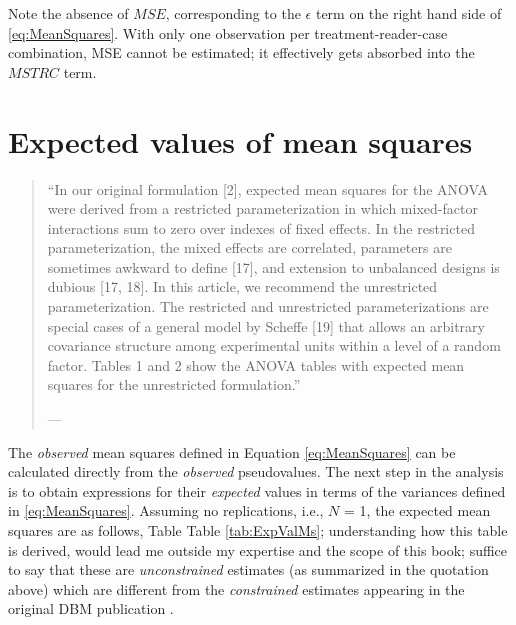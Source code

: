 \documentclass[
]{book}
\begin{document}
Note the absence of \(MSE\), corresponding to the \(\epsilon\) term on the right hand side of \eqref{eq:MeanSquares}. With only one observation per treatment-reader-case combination, MSE cannot be estimated; it effectively gets absorbed into the \(MSTRC\) term.

\hypertarget{expected-values-of-mean-squares}{%
\section{Expected values of mean squares}\label{expected-values-of-mean-squares}}

\begin{quote}
``In our original formulation {[}2{]}, expected mean squares for the ANOVA were derived from a restricted parameterization in which mixed-factor interactions sum to zero over indexes of fixed effects. In the restricted parameterization, the mixed effects are correlated, parameters are sometimes awkward to define {[}17{]}, and extension to unbalanced designs is dubious {[}17, 18{]}. In this article, we recommend the unrestricted parameterization. The restricted and unrestricted parameterizations are special cases of a general model by Scheffe {[}19{]} that allows an arbitrary covariance structure among experimental units within a level of a random factor. Tables 1 and 2 show the ANOVA tables with expected mean squares for the unrestricted formulation.''

--- \citep{RN2079}
\end{quote}

The \emph{observed} mean squares defined in Equation \eqref{eq:MeanSquares} can be calculated directly from the \emph{observed} pseudovalues. The next step in the analysis is to obtain expressions for their \emph{expected} values in terms of the variances defined in \eqref{eq:MeanSquares}. Assuming no replications, i.e., \(N\) = 1, the expected mean squares are as follows, Table Table \ref{tab:ExpValMs}; understanding how this table is derived, would lead me outside my expertise and the scope of this book; suffice to say that these are \emph{unconstrained} estimates (as summarized in the quotation above) which are different from the \emph{constrained} estimates appearing in the original DBM publication \citep{RN204}.
\end{document}
